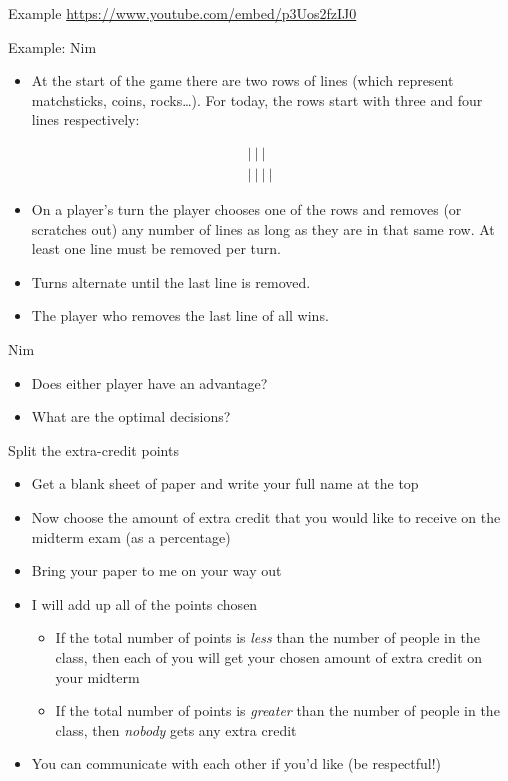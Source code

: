 \documentclass[10pt]{beamer}
\begin{document}
\begin{frame}[label={sec:org90d1569}]{}
\alert{Example}
\href{https://www.youtube.com/embed/p3Uos2fzIJ0}{https://www.youtube.com/embed/p3Uos2fzIJ0}
\end{frame}

\begin{frame}[label={sec:org6e171c1}]{}
\alert{Example: Nim}
\begin{itemize}
\item At the start of the game there are two rows of lines (which represent matchsticks, coins, rocks\ldots{}).  For today, the rows start with three and four lines respectively:
\end{itemize}

\begin{align*}
|~|~|~\phantom{|} \\
|~|~|~|
\end{align*}

\begin{itemize}
\item On a player’s turn the player chooses one of the rows and removes (or scratches out) any number of lines as long as they are in that same row. At least one line must be removed per turn.
\item Turns alternate until the last line is removed.
\item The player who removes the last line of all wins.
\end{itemize}
\end{frame}


\begin{frame}[label={sec:org9f9762d}]{}
\alert{Nim}
\begin{itemize}
\item Does either player have an advantage?
\item What are the optimal decisions?
\end{itemize}
\end{frame}

\begin{frame}[label={sec:orgd3a0d3d}]{}
\alert{Split the extra-credit points}
\begin{itemize}
\item Get a blank sheet of paper and write your full name at the top
\item Now choose the amount of extra credit that you would like to receive on the midterm exam (as a percentage)
\item Bring your paper to me on your way out
\item I will add up all of the points chosen
\begin{itemize}
\item If the total number of points is \emph{less} than the number of people in the class, then each of you will get your chosen amount of extra credit on your midterm
\item If the total number of points is \emph{greater} than the number of people in the class, then \emph{nobody} gets any extra credit
\end{itemize}
\item You can communicate with each other if you'd like (be respectful!)
\end{itemize}
\end{frame}
\end{document}
